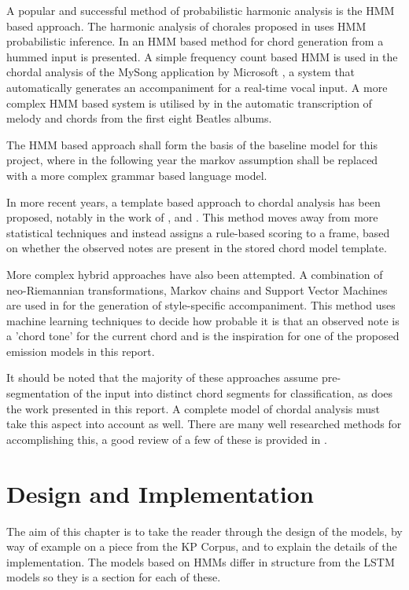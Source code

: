 \documentclass[bsc,singlespacing,logo, parskip, deptreport]{infthesis}
\begin{document}
A popular and successful method of probabilistic harmonic analysis is the HMM based approach. The harmonic analysis of chorales proposed in \cite{allan2005harmonising} uses HMM probabilistic inference. In \cite{lee2004ring} an HMM based method for chord generation from a hummed input is presented. A simple frequency count based HMM is used in the chordal analysis of the MySong application by Microsoft \cite[]{mysong}, a system that automatically generates an accompaniment for a real-time vocal input. A more complex HMM based system is utilised by \cite{ryynanen2008automatic} in the automatic transcription of melody and chords from the first eight Beatles albums.

The HMM based approach shall form the basis of the baseline model for this project, where in the following year the markov assumption shall be replaced with a more complex grammar based language model. 

In more recent years, a template based approach to chordal analysis has been proposed, notably in the work of \cite{pardo2002algorithms}, \cite{oudre2009template} and \cite{oudre2011probabilistic}. This method moves away from more statistical techniques and instead assigns a rule-based scoring to a frame, based on whether the observed notes are present in the stored chord model template.

More complex hybrid approaches have also been attempted. A combination of neo-Riemannian transformations, Markov chains and Support Vector Machines are used in \cite{chuan2007hybrid} for the generation of style-specific accompaniment. This method uses machine learning techniques to decide how probable it is that an observed note is a 'chord tone' for the current chord and is the inspiration for one of the proposed emission models in this report.  

It should be noted that the majority of these approaches assume pre-segmentation of the input into distinct chord segments for classification, as does the work presented in this report. A complete model of chordal analysis must take this aspect into account as well. There are many well researched methods for accomplishing this, a good review of a few of these is provided in \cite{pardo2002algorithms}.

\chapter{Design and Implementation}
The aim of this chapter is to take the reader through the design of the models, by way of example on a piece from the KP Corpus, and to explain the details of the implementation. The models based on HMMs differ in structure from the LSTM models so they is a section for each of these.
\end{document}
